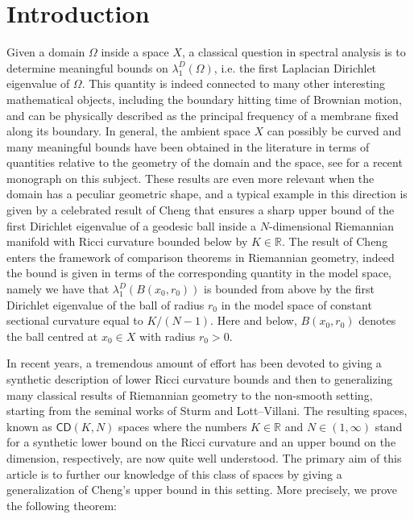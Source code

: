 \documentclass[12pt]{article}
\newcommand{\R}{\mathbb{R}}
\theoremstyle{plain}
\theoremstyle{definition}
\begin{document}
\tableofcontents

\section{Introduction} %
\label{sec:intro}

Given a domain $\Omega$ inside a space $X$, a classical question in spectral analysis is to determine meaningful bounds on $\lambda_1^D(\Omega)$, i.e. the first Laplacian Dirichlet eigenvalue of $\Omega$. This quantity is indeed connected to many other interesting mathematical objects, including the boundary hitting time of Brownian motion, and can be physically described as the principal frequency of a membrane fixed along its boundary. 
In general, the ambient space $X$ can possibly be curved and many meaningful bounds have been obtained in the literature in terms of quantities relative to the geometry of the domain and the space, see \cite{LMP23} for a recent monograph on this subject. These results are even more relevant when the domain has a peculiar geometric shape, and a typical example in this direction is given by a celebrated result of Cheng \cite{cheng-bound} that ensures a sharp upper bound of the first Dirichlet eigenvalue of a geodesic ball inside a $N$-dimensional Riemannian manifold with Ricci curvature bounded below by $K\in \R$. The result of Cheng enters the framework of comparison theorems in Riemannian geometry, indeed the bound is given in terms of the corresponding quantity in the model space, namely we have that $\lambda_1^D(B(x_0,r_0))$ is bounded from above by the first Dirichlet eigenvalue of the ball of radius $r_0$ in the model space of constant sectional curvature equal to $K/(N-1)$. Here and below, $B(x_0,r_0)$ denotes the ball centred at $x_0\in X$ with radius $r_0>0$.

In recent years, a tremendous amount of effort has been devoted to giving a synthetic description of lower Ricci curvature bounds and then to generalizing many classical results of Riemannian geometry to the non-smooth setting, starting from the seminal works of Sturm \cite{St,St1} and Lott–Villani\cite{LottVillani-Annals2009}. The resulting spaces, known as $\mathsf{CD}(K,N)$ spaces where the numbers $K\in \mathbb{R}$ and $N\in (1,\infty)$ stand for a synthetic lower bound on the Ricci curvature and an upper bound on the dimension, respectively, are now quite well understood. The primary aim of this article is to further our knowledge of this class of spaces by giving a generalization of Cheng's upper bound in this setting. More precisely, we prove the following theorem:
\end{document}
